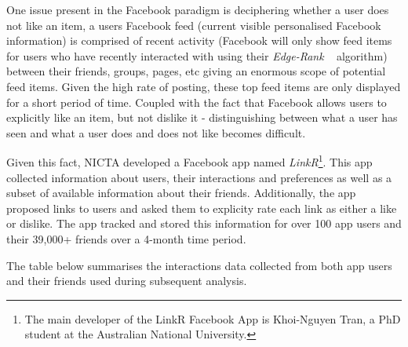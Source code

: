 One issue present in the Facebook paradigm is deciphering whether a user does not like an item, a users Facebook feed (current visible 
personalised Facebook information) is comprised of recent
activity (Facebook will only show feed 
items for users who have recently interacted with using their \emph{Edge-Rank} ~\cite{edge} algorithm) between their friends, groups, pages, etc giving an enormous scope of potential feed items.
Given the high rate of posting, these top feed items are only displayed for a short period of time. Coupled 
with the fact that Facebook allows users to explicitly like an item, but not dislike it - distinguishing between what 
a user has seen and what a user does and does not like becomes difficult.


Given this fact, NICTA developed a Facebook app named \emph{LinkR}\footnote{The main developer of the LinkR Facebook App is Khoi-Nguyen Tran, a PhD student at the Australian National University.}.
This app collected information about users, their interactions and preferences as well as a subset of available information about 
their friends. Additionally, the app proposed links to users and asked them to explicity rate each link as either a like or dislike. 
The app tracked and stored this information for over 100 app users and their 39,000+ friends over a 4-month time period.

The table below summarises the interactions data collected from both app users and their friends used during subsequent analysis.

